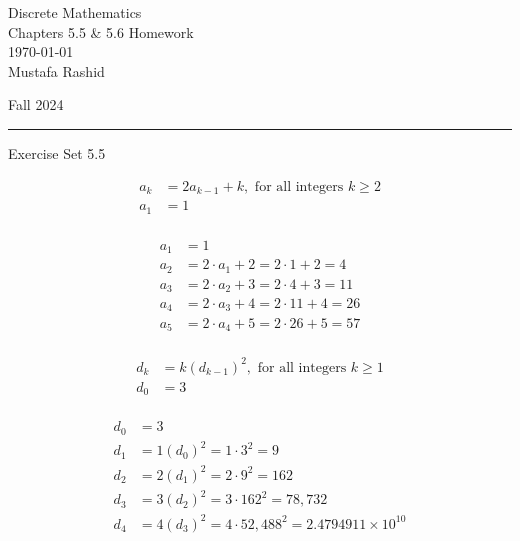 \documentclass[12pt,letterpaper, onecolumn]{exam}
\begin{document}
	
	\begingroup  
	\noindent\LARGE Discrete Mathematics\\
	\noindent\LARGE Chapters 5.5 \& 5.6 Homework\\
	\noindent\large \today\\
	\noindent\large Mustafa Rashid\par
	\noindent\large Fall 2024\par
	\endgroup
	\rule{\textwidth}{0.4pt}
	\pointsdroppedatright
	\printanswers
	\renewcommand{\solutiontitle}{\noindent\textbf{Ans:}\enspace}  
	
	\centering\large Exercise Set 5.5\\
	\begin{questions}

	\setcounter{question}{1}\question 
	\begin{align*}
		a_k&=2a_{k-1}+k, \textrm{ for all integers }k\geq 2\\
		a_1&=1\\
	\end{align*}
	\begin{solution}
		\begin{align*}
		a_1&=1\\
		a_2&=2\cdot a_1+2=2\cdot1+2=4\\
		a_3&=2\cdot a_2+3=2\cdot4+3=11\\
		a_4&=2\cdot a_3+4=2\cdot11+4=26\\
		a_5&=2\cdot a_4+5=2\cdot26+5=57\\
		\end{align*}
	\end{solution}
	\setcounter{question}{3} \question 
	\begin{align*}
		d_k&=k(d_{k-1})^2, \textrm{ for all integers }k\geq 1\\
		d_0&=3\\
	\end{align*}
	\begin{solution}
		\begin{align*}
			d_0&=3\\
			d_1&=1(d_0)^2=1\cdot3^2=9\\
			d_2&=2(d_1)^2=2\cdot9^2=162\\
			d_3&=3(d_2)^2=3\cdot162^2=78,732\\
			d_4&=4(d_3)^2=4\cdot52,488^2=2.4794911\times10^{10}\\
		\end{align*}
	\end{solution}

\end{questions}
\end{document}
